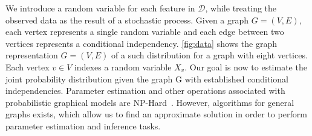 


We introduce a random variable for each feature in $\mathcal{D}$, while treating the observed data as the result of a stochastic process.
Given a graph $G=(V,E)$, each vertex represents a single random variable and each edge between two vertices represents a conditional independency. 
\fig \ref{fig:data} shows the graph representation $G=(V,E)$ of a such distribution for a graph with eight vertices. 
Each vertex $ v \in V$ indexes a random variable $X_v$.
Our goal is now to estimate the joint probability distribution given the graph G with established conditional independencies.
Parameter estimation and other operations associated with probabilistic graphical models are NP-Hard~\cite{cooper1990computational}.
However, algorithms for general graphs exists, which allow us to find an approximate solution in order to perform parameter estimation and inference tasks.

